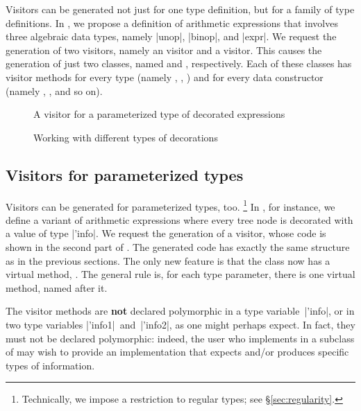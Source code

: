 \documentclass[11pt,a4paper,twoside]{article}
\renewcommand{\emph}[1]{\textbf{#1}}
\begin{document}
Visitors can be generated not just for one type definition, but for a family
of type definitions. In , we propose a definition of
arithmetic expressions that involves three algebraic data types, namely
\oc|unop|, \oc|binop|, and \oc|expr|. We request the generation of two
visitors, namely an \iter visitor and a \map visitor. This causes the
generation of just two classes, named \iter and \map, respectively. Each of
these classes has visitor methods for every type (namely ,
, ) and for every data constructor
(namely , , and so on).


\begin{figure}[p]
\vspace{-\baselineskip}
\caption{A visitor for a parameterized type of decorated expressions}
\label{fig:expr09}
\end{figure}

\begin{figure}[p]
\caption{Working with different types of decorations}
\label{fig:expr10}
\end{figure}

\subsection{Visitors for parameterized types}
\label{sec:intro:parameterized}

Visitors can be generated for parameterized types, too.%
%
\footnote{Technically, we impose a restriction to regular types; see
  \S\ref{sec:regularity}.}
%
In , for instance, we define a variant of arithmetic
expressions where every tree node is decorated with a value of type
\oc|'info|. We request the generation of a \map visitor, whose code is shown
in the second part of . The generated code has exactly the
same structure as in the previous sections. The only new feature is that the
class \map now has a virtual method, . The general rule
is, for each type parameter, there is one virtual method, named after it.

The visitor methods are \emph{not} declared polymorphic in a type
variable~\oc|'info|, or in two type variables \oc|'info1|~and~\oc|'info2|, as
one might perhaps expect. In fact, they must not be declared polymorphic:
indeed, the user who implements  in a subclass of \map may
wish to provide an implementation that expects and/or produces specific types
of information.
\end{document}
